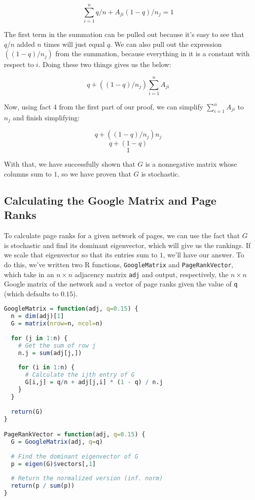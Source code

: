 \documentclass{article}
\begin{document}
$$
\sum_{i=1}^n q/n + A_{ji} (1 - q) / n_j = 1
$$

The first term in the summation can be pulled out because it's easy to see that $q/n$
added $n$ times will just equal $q$. We can also pull out the expression
$((1 - q) / n_j)$ from the summation, because everything in it is a constant with
respect to $i$. Doing these two things gives us the below:

$$
q +  ((1 - q) / n_j) \sum_{i=1}^n A_{ji}
$$

Now, using fact 4 from the first part of our proof, we can simplify $\sum_{i=1}^n A_{ji}$
to $n_j$ and finish simplifying:

$$
q +  ((1 - q) / n_j) n_j
$$
$$
q + (1 - q)
$$
$$
1
$$

With that, we have successfully shown that $G$ is a nonnegative matrix whose columns sum
to $1$, so we have proven that $G$ is stochastic.

\subsection{Calculating the Google Matrix and Page Ranks}

To calculate page ranks for a given network of pages, we can use the fact that $G$ is
stochastic and find its dominant eigenvector, which will give us the rankings. If we
scale that eigenvector so that its entries sum to $1$, we'll have our answer. To do
this, we've written two R functions, \lstinline{GoogleMatrix} and \lstinline{PageRankVector},
which take in an $n \times n$ adjacency matrix \lstinline{adj} and output, respectively,
the $n \times n$ Google matrix of the network and a vector of page ranks given the value
of \lstinline{q} (which defaults to $0.15$).

\begin{lstlisting}[language=R]
GoogleMatrix = function(adj, q=0.15) {
  n = dim(adj)[1]
  G = matrix(nrow=n, ncol=n)
  
  for (j in 1:n) {
    # Get the sum of row j
    n.j = sum(adj[j,])
    
    for (i in 1:n) {
      # Calculate the ijth entry of G
      G[i,j] = q/n + adj[j,i] * (1 - q) / n.j
    }
  }
  
  return(G)
}

PageRankVector = function(adj, q=0.15) {
  G = GoogleMatrix(adj, q=q)
  
  # Find the dominant eigenvector of G
  p = eigen(G)$vectors[,1]
  
  # Return the normalized version (inf. norm)
  return(p / sum(p))
}
\end{lstlisting}
\end{document}
